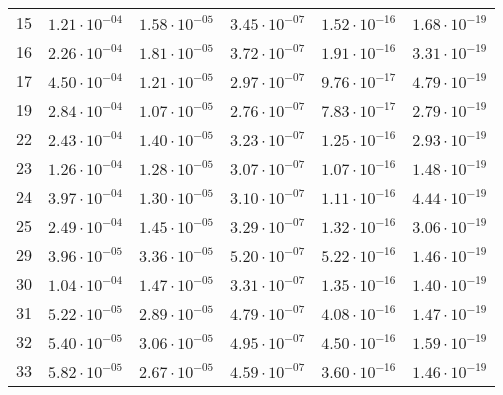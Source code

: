 \begin{table}[h]
\begin{tabular}{llllll}
		15 &$\mathrm{1.21 \cdot 10^{-04}}$ & $\mathrm{1.58 \cdot 10^{-05}}$ & $\mathrm{3.45 \cdot 10^{-07}}$ & $\mathrm{1.52 \cdot 10^{-16}}$ & $\mathrm{1.68 \cdot 10^{-19}}$ \\
		16 &$\mathrm{2.26 \cdot 10^{-04}}$ & $\mathrm{1.81 \cdot 10^{-05}}$ & $\mathrm{3.72 \cdot 10^{-07}}$ & $\mathrm{1.91 \cdot 10^{-16}}$ & $\mathrm{3.31 \cdot 10^{-19}}$ \\
		17 &$\mathrm{4.50 \cdot 10^{-04}}$ & $\mathrm{1.21 \cdot 10^{-05}}$ & $\mathrm{2.97 \cdot 10^{-07}}$ & $\mathrm{9.76 \cdot 10^{-17}}$ & $\mathrm{4.79 \cdot 10^{-19}}$ \\
		19 &$\mathrm{2.84 \cdot 10^{-04}}$ & $\mathrm{1.07 \cdot 10^{-05}}$ & $\mathrm{2.76 \cdot 10^{-07}}$ & $\mathrm{7.83 \cdot 10^{-17}}$ & $\mathrm{2.79 \cdot 10^{-19}}$ \\
		22 &$\mathrm{2.43 \cdot 10^{-04}}$ & $\mathrm{1.40 \cdot 10^{-05}}$ & $\mathrm{3.23 \cdot 10^{-07}}$ & $\mathrm{1.25 \cdot 10^{-16}}$ & $\mathrm{2.93 \cdot 10^{-19}}$ \\
		23 &$\mathrm{1.26 \cdot 10^{-04}}$ & $\mathrm{1.28 \cdot 10^{-05}}$ & $\mathrm{3.07 \cdot 10^{-07}}$ & $\mathrm{1.07 \cdot 10^{-16}}$ & $\mathrm{1.48 \cdot 10^{-19}}$ \\
		24 &$\mathrm{3.97 \cdot 10^{-04}}$ & $\mathrm{1.30 \cdot 10^{-05}}$ & $\mathrm{3.10 \cdot 10^{-07}}$ & $\mathrm{1.11 \cdot 10^{-16}}$ & $\mathrm{4.44 \cdot 10^{-19}}$ \\
		25 &$\mathrm{2.49 \cdot 10^{-04}}$ & $\mathrm{1.45 \cdot 10^{-05}}$ & $\mathrm{3.29 \cdot 10^{-07}}$ & $\mathrm{1.32 \cdot 10^{-16}}$ & $\mathrm{3.06 \cdot 10^{-19}}$ \\
		29 &$\mathrm{3.96 \cdot 10^{-05}}$ & $\mathrm{3.36 \cdot 10^{-05}}$ & $\mathrm{5.20 \cdot 10^{-07}}$ & $\mathrm{5.22 \cdot 10^{-16}}$ & $\mathrm{1.46 \cdot 10^{-19}}$ \\
		30 &$\mathrm{1.04 \cdot 10^{-04}}$ & $\mathrm{1.47 \cdot 10^{-05}}$ & $\mathrm{3.31 \cdot 10^{-07}}$ & $\mathrm{1.35 \cdot 10^{-16}}$ & $\mathrm{1.40 \cdot 10^{-19}}$ \\
		31 &$\mathrm{5.22 \cdot 10^{-05}}$ & $\mathrm{2.89 \cdot 10^{-05}}$ & $\mathrm{4.79 \cdot 10^{-07}}$ & $\mathrm{4.08 \cdot 10^{-16}}$ & $\mathrm{1.47 \cdot 10^{-19}}$ \\
		32 &$\mathrm{5.40 \cdot 10^{-05}}$ & $\mathrm{3.06 \cdot 10^{-05}}$ & $\mathrm{4.95 \cdot 10^{-07}}$ & $\mathrm{4.50 \cdot 10^{-16}}$ & $\mathrm{1.59 \cdot 10^{-19}}$ \\
		33 &$\mathrm{5.82 \cdot 10^{-05}}$ & $\mathrm{2.67 \cdot 10^{-05}}$ & $\mathrm{4.59 \cdot 10^{-07}}$ & $\mathrm{3.60 \cdot 10^{-16}}$ & $\mathrm{1.46 \cdot 10^{-19}}$ \\

\end{tabular}
\end{table}
